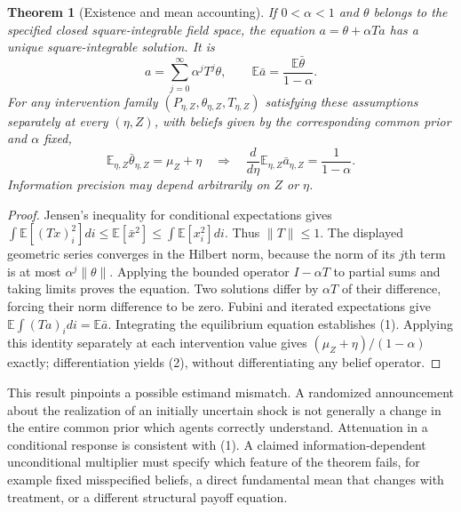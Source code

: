 \documentclass[11pt]{article}
\newtheorem{theorem}{Theorem}
\theoremstyle{remark}
\newcommand{\E}{\mathbb E}
\begin{document}
\begin{theorem}[Existence and mean accounting]
If $0<\alpha<1$ and $\theta$ belongs to the specified closed square-integrable field space, the equation
$a=\theta+\alpha Ta$ has a unique square-integrable solution. It is
\[
 a=\sum_{j=0}^{\infty}\alpha^jT^j\theta,
 \qquad \E\bar a=\frac{\E\bar\theta}{1-\alpha}.           \tag{1}
\]
For any intervention family $(P_{\eta,Z},\theta_{\eta,Z},T_{\eta,Z})$ satisfying these assumptions separately at every $(\eta,Z)$, with beliefs given by the corresponding common prior and $\alpha$ fixed,
\[
 \E_{\eta,Z}\bar\theta_{\eta,Z}=\mu_Z+\eta
 \quad\Longrightarrow\quad
 \frac{d}{d\eta}\E_{\eta,Z}\bar a_{\eta,Z}
       =\frac1{1-\alpha}.                                \tag{2}
\]
Information precision may depend arbitrarily on $Z$ or $\eta$.
\end{theorem}
\begin{proof}
Jensen's inequality for conditional expectations gives
$\int\E[(Tx)_i^2]di\leq\E[\bar x^2]\leq\int\E[x_i^2]di$.
Thus $\|T\|\leq1$. The displayed geometric series converges in the Hilbert norm, because the norm of its $j$th term is at most $\alpha^j\|\theta\|$. Applying the bounded operator $I-\alpha T$ to partial sums and taking limits proves the equation. Two solutions differ by $\alpha T$ of their difference, forcing their norm difference to be zero. Fubini and iterated expectations give
$\E\int(Ta)_i di=\E\bar a$. Integrating the equilibrium equation establishes (1). Applying this identity separately at each intervention value gives $(\mu_Z+\eta)/(1-\alpha)$ exactly; differentiation yields (2), without differentiating any belief operator.
\end{proof}

This result pinpoints a possible estimand mismatch. A randomized announcement about the realization of an initially uncertain shock is not generally a change in the entire common prior which agents correctly understand. Attenuation in a conditional response is consistent with (1). A claimed information-dependent unconditional multiplier must specify which feature of the theorem fails, for example fixed misspecified beliefs, a direct fundamental mean that changes with treatment, or a different structural payoff equation.
\end{document}
